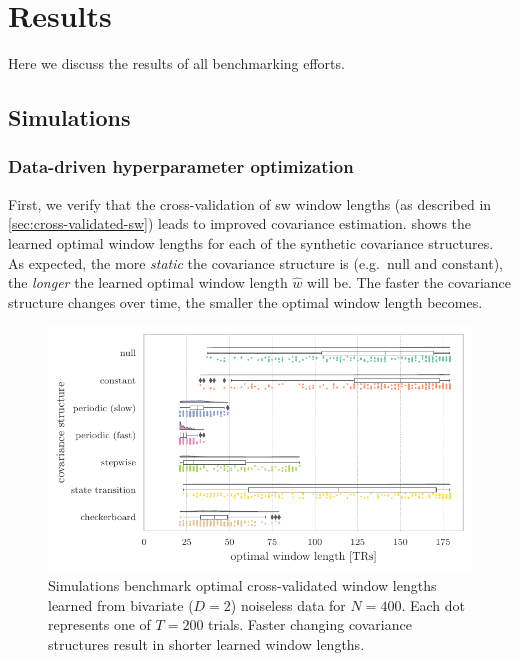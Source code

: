 \clearpage
\section{Results}\label{sec:benchmarking-results}

Here we discuss the results of all benchmarking efforts.

\subsection{Simulations}\label{sec:simulations-results}

\subsubsection{Data-driven hyperparameter optimization}

First, we verify that the cross-validation of \gls{sw} window lengths (as described in \cref{sec:cross-validated-sw}) leads to improved covariance estimation.
 shows the learned optimal window lengths for each of the synthetic covariance structures.
As expected, the more \emph{static} the covariance structure is (e.g.~null and constant), the \emph{longer} the learned optimal window length $\hat{w}$ will be.
The faster the covariance structure changes over time, the smaller the optimal window length becomes.


\begin{figure}[ht]
  \centering
  \includegraphics[width=\textwidth]{fig/sim/d2/N0400_T0200/no_noise/SW_cross_validated_optimal_window_lengths}
  \caption{
    Simulations benchmark optimal cross-validated window lengths learned from bivariate ($D = 2$) noiseless data for $N = 400$.
    Each dot represents one of $T = 200$ trials.
    Faster changing covariance structures result in shorter learned window lengths.
  }\label{fig:sim-optimal-window-lengths}
\end{figure}


